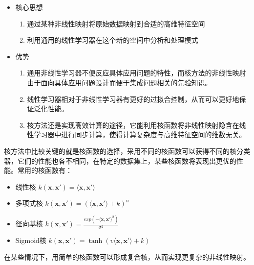 \documentclass[12pt,a4paper,CJK]{beamer}
\begin{document}
\begin{CJK*}{UTF8}{gkai}
\begin{frame}{\subsecname}
\begin{itemize}
\item 核心思想\\
\begin{enumerate}
\item 通过某种非线性映射将原始数据映射到合适的高维特征空间
\item 利用通用的线性学习器在这个新的空间中分析和处理模式
\end{enumerate}
\item 优势\\
\begin{enumerate}
\item 通用非线性学习器不便反应具体应用问题的特性，而核方法的非线性映射由于面向具体应用问题设计而便于集成问题相关的先验知识。
\item 线性学习器相对于非线性学习器有更好的过拟合控制，从而可以更好地保证泛化性能。
\item 核方法还是实现高效计算的途径，它能利用核函数将非线性映射隐含在线性学习器中进行同步计算，使得计算复杂度与高维特征空间的维数无关。
\end{enumerate}
\end{itemize}
\end{frame}

\begin{frame}{\subsecname}

核方法中比较关键的就是核函数的选择，采用不同的核函数可以获得不同的核分类器，它们的性能也各不相同，在特定的数据集上，某些核函数将表现出更优的性能。常用的核函数有：
\begin{itemize}
\item 线性核	$k(\boldsymbol{x},\boldsymbol{x'})=\langle \boldsymbol{x},\boldsymbol{x'} \rangle$
\item 多项式核	$k(\boldsymbol{x},\boldsymbol{x'})=(\langle \boldsymbol{x},\boldsymbol{x'} \rangle+k)^n$
\item 径向基核	$k(\boldsymbol{x},\boldsymbol{x'})=\frac{exp(-\langle \boldsymbol{x},\boldsymbol{x'} \rangle^2)}{\sigma^2}$
\item Sigmoid核	$k(\boldsymbol{x},\boldsymbol{x'})=\tanh(v\langle \boldsymbol{x},\boldsymbol{x'} \rangle+k)$
\end{itemize}
在某些情况下，用简单的核函数可以形成复合核，从而实现更复杂的非线性映射。

\end{frame}



\end{CJK*}
\end{document}

